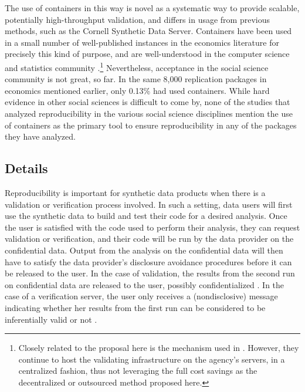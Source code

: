\documentclass[inline]{hdsr}
\begin{document}
The use of containers in this way is novel as a systematic way to provide scalable, potentially high-throughput validation, and differs in usage from previous methods, such as the Cornell Synthetic Data Server. Containers have been used in a small number of well-published instances in the economics literature for precisely this kind of purpose, and are well-understood in the computer science and statistics community \citep{boettiger_introduction_2015,moreau_containers_2023}.\footnote{Closely related to the proposal here is the mechanism used in \citet{guimaraes_reproducibility_2023}. However, they continue to host the validating infrastructure on the agency's servers, in a centralized fashion, thus not leveraging the full cost savings as the decentralized or outsourced method proposed here.} Nevertheless, acceptance in the social science community is not great, so far. In the same 8,000 replication packages in economics mentioned earlier, only 0.13\% had used containers. While hard evidence in other social sciences is difficult to come by, none of the studies that analyzed reproducibility in the various social science disciplines mention the use of containers as the primary tool to ensure reproducibility in any of the packages they have analyzed.

\subsection{Details}


Reproducibility is important for synthetic data products when there
is a validation or verification process involved. In such a setting, data users will first use the synthetic
data to build and test their code for a desired analysis. Once the user is satisfied with the code used to
perform their analysis, they can request validation or verification, and their code will be run by the data provider on the confidential data. Output from the analysis on the confidential data will then have to satisfy the data provider's disclosure avoidance procedures before it can be released to the user. In the case of validation, the results from the second run on confidential data are released to the user, possibly confidentialized \citep{u.s.censusbureauSIPPSyntheticBeta2015b}. In the case of a verification server, the user only receives a (nondisclosive) message indicating whether her results from the first run can be considered to be inferentially valid or not \citep{barrientos_providing_2018}.
\end{document}
